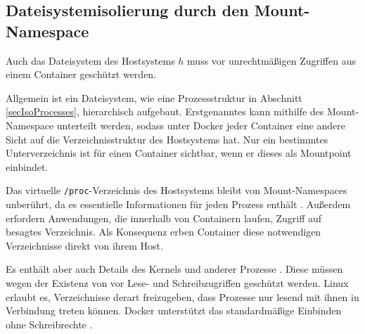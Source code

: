 \documentclass[../main.tex]{subfiles}
\begin{document}

    \subsection{Dateisystemisolierung durch den Mount-Namespace}
			Auch das Dateisystem des Hostsystems \(h\) muss vor unrechtmäßigen Zugriffen aus einem Container \cbroken{} geschützt werden.

			Allgemein ist ein Dateisystem, wie eine Prozessstruktur in Abschnitt \ref{secIsoProcesses}, hierarchisch aufgebaut. Erstgenanntes kann mithilfe des Mount-Namespace unterteilt werden, sodass unter Docker jeder Container eine andere Sicht auf die Verzeichnisstruktur des Hostsystems hat. Nur ein bestimmtes Unterverzeichnis ist für einen Container sichtbar, wenn er dieses als Mountpoint einbindet.

			Das virtuelle \texttt{/proc}-Verzeichnis des Hostsystems bleibt von Mount-Namespaces unberührt, da es essentielle Informationen für jeden Prozess enthält \cite{creatingContainers}\cite{secPart1}. Außerdem erfordern Anwendungen, die innerhalb von Containern laufen, Zugriff auf besagtes Verzeichnis. Als Konsequenz erben Container diese notwendigen Verzeichnisse direkt von ihrem Host.

			Es enthält aber auch Details des Kernels und anderer Prozesse \cite{proc}. Diese müssen wegen der Existenz von \cbroken{} vor Lese- und Schreibzugriffen geschützt werden. Linux erlaubt es, Verzeichnisse derart freizugeben, dass Prozesse nur lesend mit ihnen in Verbindung treten können. Docker unterstützt das standardmäßige Einbinden ohne Schreibrechte \cite[S.4f.]{dockerSecIntro}.




\end{document}
